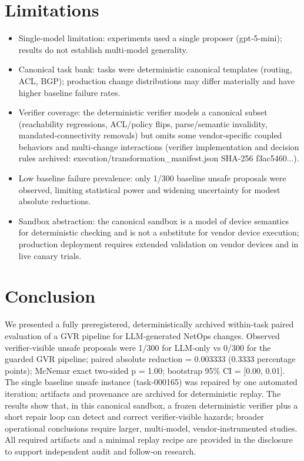 \documentclass[conference]{IEEEtran}
\begin{document}
\section{Limitations}
\begin{itemize}
\item Single‑model limitation: experiments used a single proposer (gpt‑5‑mini); results do not establish multi‑model generality.
\item Canonical task bank: tasks were deterministic canonical templates (routing, ACL, BGP); production change distributions may differ materially and have higher baseline failure rates.
\item Verifier coverage: the deterministic verifier models a canonical subset (reachability regressions, ACL/policy flips, parse/semantic invalidity, mandated‑connectivity removals) but omits some vendor‑specific coupled behaviors and multi‑change interactions (verifier implementation and decision rules archived: execution/transformation\_manifest.json SHA‑256 f3ac5460...).
\item Low baseline failure prevalence: only 1/300 baseline unsafe proposals were observed, limiting statistical power and widening uncertainty for modest absolute reductions.
\item Sandbox abstraction: the canonical sandbox is a model of device semantics for deterministic checking and is not a substitute for vendor device execution; production deployment requires extended validation on vendor devices and in live canary trials.
\end{itemize}

\section{Conclusion}
We presented a fully preregistered, deterministically archived within‑task paired evaluation of a GVR pipeline for LLM‑generated NetOps changes. Observed verifier‑visible unsafe proposals were 1/300 for LLM‑only vs 0/300 for the guarded GVR pipeline; paired absolute reduction = 0.003333 (0.3333 percentage points); McNemar exact two‑sided p = 1.00; bootstrap 95\% CI = [0.00, 0.01]. The single baseline unsafe instance (task‑000165) was repaired by one automated iteration; artifacts and provenance are archived for deterministic replay. The results show that, in this canonical sandbox, a frozen deterministic verifier plus a short repair loop can detect and correct verifier‑visible hazards; broader operational conclusions require larger, multi‑model, vendor‑instrumented studies. All required artifacts and a minimal replay recipe are provided in the disclosure to support independent audit and follow‑on research.
\end{document}

